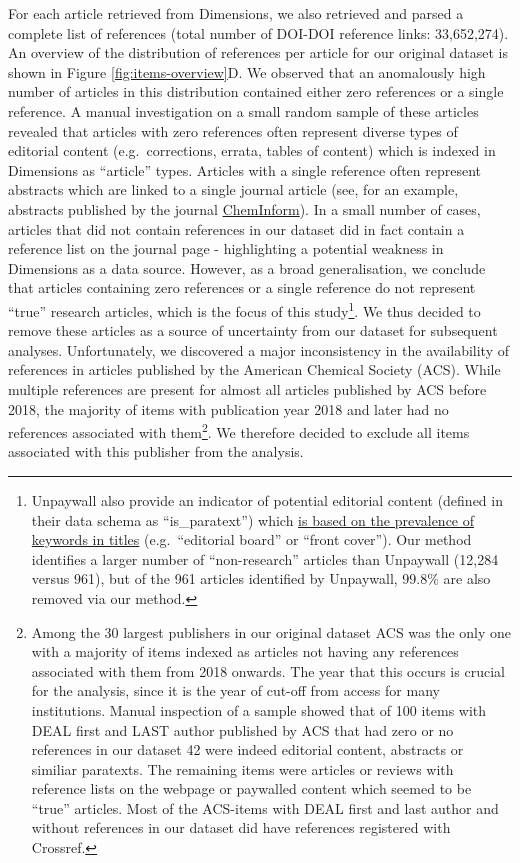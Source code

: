 \documentclass[
]{article}
\begin{document}
For each article retrieved from Dimensions, we also retrieved and parsed a complete list of references (total number of DOI-DOI reference links: 33,652,274). An overview of the distribution of references per article for our original dataset is shown in Figure \ref{fig:items-overview}D. We observed that an anomalously high number of articles in this distribution contained either zero references or a single reference. A manual investigation on a small random sample of these articles revealed that articles with zero references often represent diverse types of editorial content (e.g.~corrections, errata, tables of content) which is indexed in Dimensions as ``article'' types. Articles with a single reference often represent abstracts which are linked to a single journal article (see, for an example, abstracts published by the journal \href{https://onlinelibrary.wiley.com/journal/15222667}{ChemInform}). In a small number of cases, articles that did not contain references in our dataset did in fact contain a reference list on the journal page - highlighting a potential weakness in Dimensions as a data source. However, as a broad generalisation, we conclude that articles containing zero references or a single reference do not represent ``true'' research articles, which is the focus of this study\footnote{Unpaywall also provide an indicator of potential editorial content (defined in their data schema as ``is\_paratext'') which \href{https://support.unpaywall.org/support/solutions/articles/44001894783-what-does-is-paratext-mean-in-the-api-}{is based on the prevalence of keywords in titles} (e.g.~``editorial board'' or ``front cover''). Our method identifies a larger number of ``non-research'' articles than Unpaywall (12,284 versus 961), but of the 961 articles identified by Unpaywall, 99.8\% are also removed via our method.}. We thus decided to remove these articles as a source of uncertainty from our dataset for subsequent analyses. Unfortunately, we discovered a major inconsistency in the availability of references in articles published by the American Chemical Society (ACS). While multiple references are present for almost all articles published by ACS before 2018, the majority of items with publication year 2018 and later had no references associated with them\footnote{Among the 30 largest publishers in our original dataset ACS was the only one with a majority of items indexed as articles not having any references associated with them from 2018 onwards. The year that this occurs is crucial for the analysis, since it is the year of cut-off from access for many institutions. Manual inspection of a sample showed that of 100 items with DEAL first and LAST author published by ACS that had zero or no references in our dataset 42 were indeed editorial content, abstracts or similiar paratexts. The remaining items were articles or reviews with reference lists on the webpage or paywalled content which seemed to be ``true'' articles. Most of the ACS-items with DEAL first and last author and without references in our dataset did have references registered with Crossref.}. We therefore decided to exclude all items associated with this publisher from the analysis.
\end{document}
